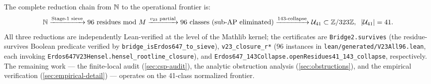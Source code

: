 The complete reduction chain from $\mathbb{N}$ to the operational
frontier is:
\[
\mathbb{N} \xrightarrow{\text{Stage-1 sieve}} 96 \text{ residues mod } M
\xrightarrow{\text{$v_{23}$ partial}} 96 \text{ classes (sub-AP eliminated)}
\xrightarrow{\text{143-collapse}} \mathcal{U}_{41} \subset \mathbb{Z} / 323\mathbb{Z}, \;\; |\mathcal{U}_{41}| = 41 .
\]
All three reductions are independently Lean-verified at the level
of the Mathlib kernel; the certificates are
\texttt{Bridge2.survives} (the residue-survives Boolean predicate
verified by \texttt{bridge\_isErdos647\_to\_sieve}),
\texttt{v23\_closure\_r*} (96 instances in
\texttt{lean/generated/V23All96.lean}, each invoking
\texttt{Erdos647V23Hensel.hensel\_rootline\_closure}), and
\texttt{Erdos647\_143Collapse.openResidues41\_143\_collapse},
respectively. The remaining work --- the finite-local audit
(\cref{sec:csp-audit}), the analytic obstruction analysis
(\cref{sec:obstructions}), and the empirical verification
(\cref{sec:empirical-detail}) --- operates on the 41-class
normalized frontier.

